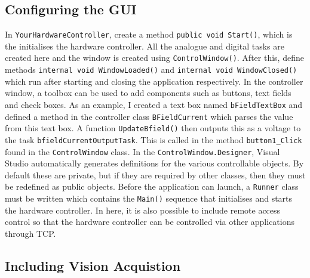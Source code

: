 \documentclass{article}
\begin{document}
\subsection{Configuring the GUI}
In \lstinline|YourHardwareController|, create a method \lstinline|public void Start()|, which is the initialises the hardware controller. All the analogue and digital tasks are created here and the window is created using \lstinline|ControlWindow()|. After this, define methods \lstinline|internal void WindowLoaded()| and \lstinline|internal void WindowClosed()| which run after starting and closing the application respectively. In the controller window, a toolbox can be used to add components such as buttons, text fields and check boxes. As an example, I created a text box named \lstinline|bFieldTextBox| and defined a method in the controller class \lstinline|BFieldCurrent| which parses the value from this text box. A function \lstinline|UpdateBfield()| then outputs this as a voltage to the task \lstinline|bfieldCurrentOutputTask|. This is called in the method \lstinline|button1_Click| found in the \lstinline|ControlWindow| class. In the \lstinline|ControlWindow.Designer|, Visual Studio automatically generates definitions for the various controllable objects. By default these are private, but if they are required by other classes, then they must be redefined as public objects. Before the application can launch, a \lstinline|Runner| class must be written which contains the \lstinline|Main()| sequence that initialises and starts the hardware controller. In here, it is also possible to include remote access control so that the hardware controller can be controlled via other applications through TCP.
\subsection{Including Vision Acquistion}
\end{document}
